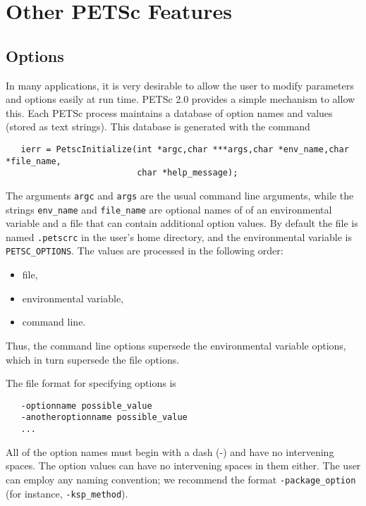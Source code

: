 \chapter{Other PETSc Features}

\section{Options}  
\label{sec:options}

In many applications, it is very desirable to allow the user to modify 
parameters and options easily at run time. PETSc 2.0 provides a simple 
mechanism to allow this. Each PETSc process maintains a database of option 
names and values (stored as text strings). This database is generated with 
the command
\begin{verbatim}
   ierr = PetscInitialize(int *argc,char ***args,char *env_name,char *file_name,
                          char *help_message);
\end{verbatim}
The arguments {\tt argc} and {\tt args} are the usual command line arguments, 
while the strings {\tt env\_name} and {\tt file\_name} are optional names of 
of an environmental variable and a file that can contain additional option 
values. 
By default the file is named {\tt .petscrc}  in the 
user's home directory, and the environmental variable is 
{\tt PETSC\_OPTIONS}.   
The values are processed 
in the following order:
\begin{itemize}
\item file,
\item environmental variable,
\item command line.
\end{itemize}
Thus, the command line options supersede the environmental variable
options, which in turn supersede the file options.

The file format for specifying options is 
\begin{verbatim}
   -optionname possible_value
   -anotheroptionname possible_value
   ...
\end{verbatim}
All of the option names must begin with a dash (-) and have no intervening 
spaces.  The option values can have no intervening spaces in them either.
The user can employ any naming convention; we recommend the format
{\tt -package\_option} (for instance, {\tt -ksp\_method}).

